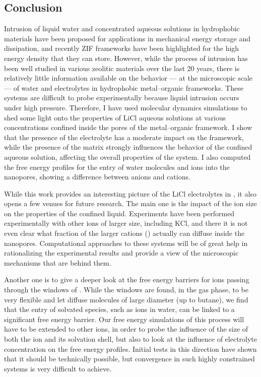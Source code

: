 \documentclass[thesis]{subfiles}
\begin{document}
\newpage
\subsection*{Conclusion}

Intrusion of liquid water and concentrated aqueous solutions in hydrophobic
materials have been proposed for applications in mechanical energy storage and
dissipation, and recently ZIF frameworks have been highlighted for the high
energy density that they can store. However, while the process of intrusion has
been well studied in various zeolitic materials over the last 20 years, there is
relatively little information available on the behavior --- at the microscopic
scale --- of water and electrolytes in hydrophobic metal--organic frameworks.
These systems are difficult to probe experimentally because liquid intrusion
occurs under high pressure. Therefore, I have used molecular dynamics
simulations to shed some light onto the properties of LiCl aqueous solutions at
various concentrations confined inside the pores of the  metal--organic
framework. I show that the presence of the electrolyte has a moderate impact on
the  framework, while the presence of the  matrix strongly influences
the behavior of the confined aqueous solution, affecting the overall properties
of the system. I also computed the free energy profiles for the entry of water
molecules and ions into the nanopores, showing a difference between anions and
cations.

While this work provides an interesting picture of the LiCl electrolytes in
, it also opens a few venues for future research. The main one is the
impact of the ion size on the properties of the confined liquid. Experiments
have been performed experimentally with other ions of larger size, including
KCl, and there it is not even clear what fraction of the larger cations
() actually can diffuse inside the nanopores. Computational approaches to
these systems will be of great help in rationalizing the experimental results
and provide a view of the microscopic mechanisms that are behind them.

Another one is to give a deeper look at the free energy barriers for ions
passing through the windows of . While the windows are found, in the gas
phase, to be very flexible and let diffuse molecules of large diameter (up to
butane), we find that the entry of solvated species, such as ions in water, can
be linked to a significant free energy barrier. Our free energy simulations of
this process will have to be extended to other ions, in order to probe the
influence of the size of both the ion and its solvation shell, but also to look
at the influence of electrolyte concentration on the free energy profiles.
Initial tests in this direction have shown that it should be technically
possible, but convergence in such highly constrained systems is very difficult
to achieve.
\end{document}
